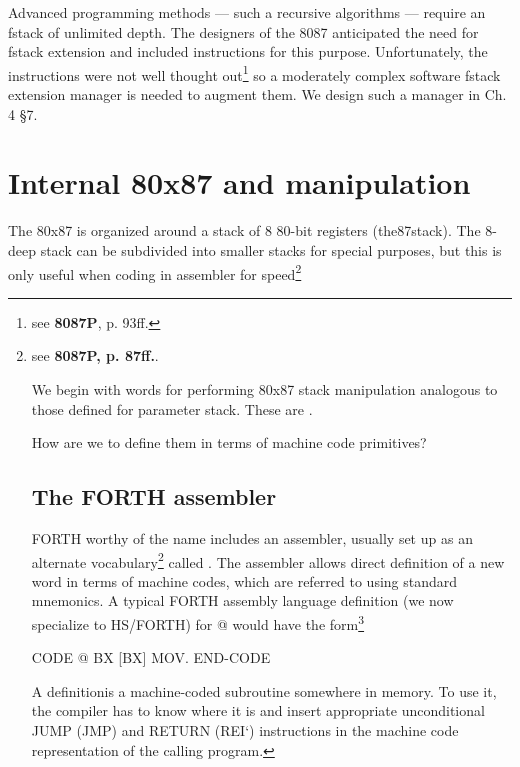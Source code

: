 {Advanced programming methods — such a recursive algorithms — require an fstack of unlimited depth. The designers of the 8087 anticipated the need for fstack extension and included instructions for this purpose. Unfortunately, the instructions were not well thought out\footnote{see \textbf{8087P}, p. 93ff.} so a moderately complex software fstack extension manager is needed to augment them. We design such a manager in Ch. 4 §7.

\section{Internal 80x87 and manipulation}

The 80x87 is organized around a stack of 8 80-bit registers (the87stack). The 8-deep stack can be subdivided into smaller stacks for special purposes, but this is only useful when coding in assembler for speed\footnote{see \textbf{8087P, p. 87ff.}.

We begin with words for performing 80x87 stack manipulation analogous to those defined for parameter stack. These are  .

How are we to define them in terms of machine code primitives?

\subsection{The FORTH assembler}

 FORTH worthy of the name includes an assembler, usually set up as an alternate vocabulary\footnote{Vocabularies are a method for subdividing the dictionary.} called . The assembler allows direct definition of a new word in terms of machine codes, which are referred to using standard mnemonics. A typical FORTH assembly language definition (we now specialize to HS/FORTH) for @ would have the form\footnote{BX is a CPU register, and \[BX\] means "the memory location wose address is in BX". HS/FORTH uses a naming convention in which assembler mnemonics end with a period, \textit{e.g.} MOV, . Also, HS/FORTH makes the TOS the BX register, to reduce the number of pushes and pops needed to execute simple words.}

\begin{listing}
    CODE @ BX [BX] MOV. END-CODE
\end{listing}

A  definitionis a machine-coded subroutine somewhere in memory. To use it, the compiler has to know where it is and insert appropriate unconditional JUMP (JMP) and RETURN (REI‘) instructions in the machine code representation of the calling program.

}}
